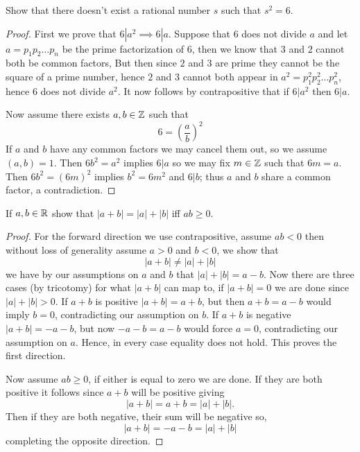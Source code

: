 

\maketitle


\question
Show that there doesn't exist a rational number $s$ such that $s^2 = 6$. 


\begin{proof}
    First we prove that $6|a^2 \implies 6|a$. Suppose that $6$ does not divide $a$ and let $a = p_1p_2 \dots p_n$ 
    be the prime factorization of $6$, then we know that $3$ and $2$ cannot both be common factors,  
    But then since $2$ and $3$ are prime they cannot be the square of a prime number, hence $2$ and $3$ cannot both 
    appear in $a^2 = p_1^2 p_2^2 \dots p_n^2$, hence $6$ does not divide $a^2$. It now follows by contrapositive that 
    if $6|a^2$ then $6|a$. 

    Now assume there exists $a, b \in \mathbb{Z}$ such that 
    \[6 = \left(\frac{a}{b}\right)^2 \]
    If $a$ and $b$ have any common factors we may cancel them out, so we assume $(a, b) = 1$. 
    Then $6b^2 = a^2$ implies $6|a$ so we may fix $m \in \mathbb{Z}$ such that $6m = a$. Then 
    $6b^2 = (6m)^2$ implies $b^2 = 6m^2$ and $6|b$; thus $a$ and $b$ share a common factor, 
    a contradiction. 

\end{proof}

\question
If $a, b \in \mathbb{R}$ show that $|a + b| = |a| + |b| $ iff $ab \geq 0$. 


\begin{proof}
    For the forward direction we use contrapositive, assume $ab < 0$ then without loss of generality assume $a > 0$ and $b<0$, we show that 
    \[|a +b | \neq |a| + |b| \] 
    we have by our assumptions on $a$ and $b$ that $|a| + |b| = a - b$. 
    Now there are three cases (by tricotomy) for what $|a+b|$ can map to, if $|a + b| = 0$
    we are done since $| a| + |b| > 0$. 
    If $a + b$ is positive $|a + b| = a + b$, but then $a + b = a - b$ would imply $b = 0$, contradicting our assumption on $b$.
    If $a + b$ is negative $|a + b| = -a -b$, but now $-a -b = a - b$ would force $a = 0$, contradicting our assumption on $a$. 
    Hence, in every case equality does not hold. This proves the first direction.
    
    Now assume $ab \geq 0$, if either is equal to zero we are done. If they are both positive it follows since $a + b$ will be positive giving 
    \[|a + b| = a + b = |a| + |b|.\]
    Then if they are both negative, their sum will be negative so,
    \[|a + b| = -a - b = |a| + |b|\]
    completing the opposite direction. 
\end{proof}

